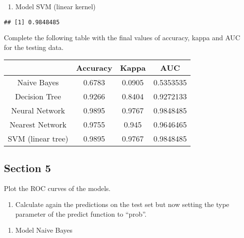 \documentclass[]{article}
\newenvironment{Shaded}{\begin{snugshade}}{\end{snugshade}}
\newcommand{\KeywordTok}[1]{\textcolor[rgb]{0.13,0.29,0.53}{\textbf{#1}}}
\newcommand{\NormalTok}[1]{#1}
\newcommand{\OperatorTok}[1]{\textcolor[rgb]{0.81,0.36,0.00}{\textbf{#1}}}
\providecommand{\tightlist}{%
  \setlength{\itemsep}{0pt}\setlength{\parskip}{0pt}}
\begin{document}
\begin{enumerate}
\def\labelenumi{\arabic{enumi}.}
\setcounter{enumi}{4}
\tightlist
\item
  Model SVM (linear kernel)
\end{enumerate}

\begin{Shaded}
\end{Shaded}

\begin{verbatim}
## [1] 0.9848485
\end{verbatim}

Complete the following table with the final values of accuracy, kappa
and AUC for the testing data.

\begin{center}
	\begin{tabular}{ |c|c|c|c| } 
		\hline
		& Accuracy & Kappa & AUC \\
		\hline
		Naive Bayes & 0.6783 & 0.0905 & 0.5353535 \\ 
		Decision Tree & 0.9266 & 0.8404 & 0.9272133 \\ 
		Neural Network & 0.9895 & 0.9767 & 0.9848485 \\ 
		Nearest Network & 0.9755 & 0.945 & 0.9646465 \\ 
		SVM (linear tree) & 0.9895 & 0.9767 & 0.9848485 \\ 
		\hline
	\end{tabular}
\end{center}

\hypertarget{section-5}{%
\subsection{Section 5}\label{section-5}}

Plot the ROC curves of the models.

\begin{enumerate}
\def\labelenumi{\alph{enumi})}
\tightlist
\item
  Calculate again the predictions on the test set but now setting the
  type parameter of the predict function to ``prob''.
\end{enumerate}

\begin{enumerate}
\def\labelenumi{\arabic{enumi}.}
\tightlist
\item
  Model Naive Bayes
\end{enumerate}
\end{document}
